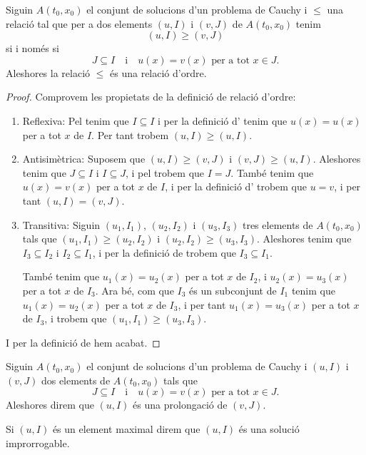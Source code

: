 \documentclass[../Apunts.tex]{subfiles}
\begin{document}
	\begin{proposition}
		\label{prop:la prolongació és una relació d'ordre}
		Siguin \(A(t_{0},x_{0})\) el conjunt de solucions d'un problema de Cauchy i \(\leq\) una relació tal que per a dos elements \((u,I)\) i \((v,J)\) de \(A(t_{0},x_{0})\) tenim
		\[(u,I)\geq(v,J)\]
		si i només si
		\[J\subseteq I\quad\text{i}\quad u(x)=v(x)\text{ per a tot }x\in J.\]
		Aleshores la relació \(\leq\) és una relació d'ordre.
		\begin{proof}
			Comprovem les propietats de la definició de relació d'ordre:
			\begin{enumerate}
				\item Reflexiva: Pel  tenim que \(I\subseteq I\) i per la definició d' tenim que \(u(x)=u(x)\) per a tot \(x\) de \(I\). Per tant trobem \((u,I)\geq(u,I)\).
				
				\item Antisimètrica: Suposem que \((u,I)\geq(v,J)\) i \((v,J)\geq(u,I)\). Aleshores tenim que \(J\subseteq I\) i \(I\subseteq J\), i pel  trobem que \(I=J\). També tenim que \(u(x)=v(x)\) per a tot \(x\) de \(I\), i per la definició d' trobem que \(u=v\), i per tant \((u,I)=(v,J)\).
				
				\item Transitiva: Siguin \((u_{1},I_{1})\), \((u_{2},I_{2})\) i \((u_{3},I_{3})\) tres elements de \(A(t_{0},x_{0})\) tals que \((u_{1},I_{1})\geq(u_{2},I_{2})\) i \((u_{2},I_{2})\geq(u_{3},I_{3})\). Aleshores tenim que \(I_{3}\subseteq I_{2}\) i \(I_{2}\subseteq I_{1}\), i per la definició de  trobem que \(I_{3}\subseteq I_{1}\).
				
				També tenim que \(u_{1}(x)=u_{2}(x)\) per a tot \(x\) de \(I_{2}\), i \(u_{2}(x)=u_{3}(x)\) per a tot \(x\) de \(I_{3}\). Ara bé, com que \(I_{3}\) és un subconjunt de \(I_{1}\) tenim que \(u_{1}(x)=u_{2}(x)\) per a tot \(x\) de \(I_{3}\), i per tant \(u_{1}(x)=u_{3}(x)\) per a tot \(x\) de \(I_{3}\), i trobem que \((u_{1},I_{1})\geq(u_{3},I_{3})\).
			\end{enumerate}
			I per la definició de  hem acabat.
		\end{proof}
	\end{proposition}
	\begin{definition}[Prolongació]
		\label{def:prolongació}
		\label{def:improrrogable}
		Siguin \(A(t_{0},x_{0})\) el conjunt de solucions d'un problema de Cauchy i \((u,I)\) i \((v,J)\) dos elements de \(A(t_{0},x_{0})\) tals que
		\[J\subseteq I\quad\text{i}\quad u(x)=v(x)\text{ per a tot }x\in J.\]
		Aleshores direm que \((u,I)\) és una prolongació de \((v,J)\).
		
		Si \((u,I)\) és un element maximal direm que \((u,I)\) és una solució improrrogable.
	\end{definition}
\end{document}
